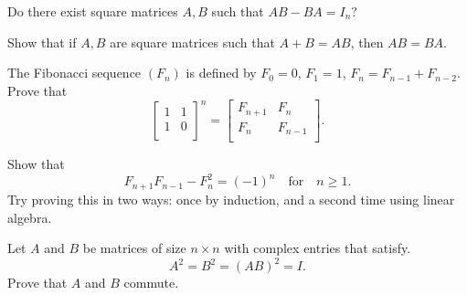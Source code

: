 \documentclass{article}
\begin{document}
        \begin{exercise}
            Do there exist square matrices $A, B$ such that $AB - BA = I_{n}?$  
        \end{exercise}
        
        \begin{exercise}
            Show that if $A, B$ are square matrices such that $A + B = AB$, then $AB = BA$. 
        \end{exercise}
        
        \begin{exercise}
        The Fibonacci sequence $(F_{n})$ is defined by $F_{0} = 0$, $F_{1} = 1$, $F_{n} = F_{n - 1} + F_{n - 2}$. Prove that 
        \[\begin{bmatrix}
            1&1\\
            1&0\\
        \end{bmatrix}^{n} = \begin{bmatrix}
            F_{n + 1}&F_{n}\\
            F_{n}&F_{n - 1}\\
            \end{bmatrix}.
        \]
        \end{exercise}
        
        \begin{exercise}
        Show that 
        \[F_{n + 1}F_{n - 1} - F_{n}^{2} = (-1)^{n} \quad \text{for}\quad n \geq 1. 
        \]
        Try proving this in two ways: once by induction, and a second time using linear algebra.
        \end{exercise}
        
        \begin{exercise}
            Let \(A\) and  \(B\) be matrices of size \(n\times n\) with complex entries that satisfy.
            \[A^2 = B^2 = (AB)^2 = I.\]
            Prove that \(A\) and \(B\) commute.
        \end{exercise}
        
        
\end{document}
